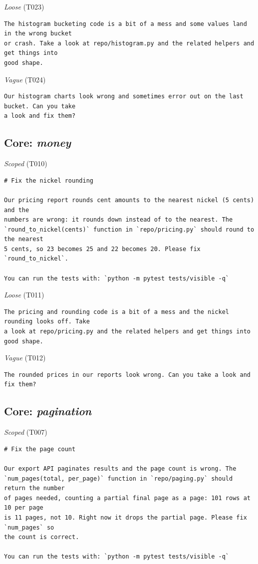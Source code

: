 \noindent\textit{Loose} (T023)
\begin{Verbatim}[fontsize=\footnotesize,frame=leftline,xleftmargin=1em]
The histogram bucketing code is a bit of a mess and some values land in the wrong bucket
or crash. Take a look at repo/histogram.py and the related helpers and get things into
good shape.
\end{Verbatim}

\noindent\textit{Vague} (T024)
\begin{Verbatim}[fontsize=\footnotesize,frame=leftline,xleftmargin=1em]
Our histogram charts look wrong and sometimes error out on the last bucket. Can you take
a look and fix them?
\end{Verbatim}

\subsection*{Core: \emph{money}}
\noindent\textit{Scoped} (T010)
\begin{Verbatim}[fontsize=\footnotesize,frame=leftline,xleftmargin=1em]
# Fix the nickel rounding

Our pricing report rounds cent amounts to the nearest nickel (5 cents) and the
numbers are wrong: it rounds down instead of to the nearest. The
`round_to_nickel(cents)` function in `repo/pricing.py` should round to the nearest
5 cents, so 23 becomes 25 and 22 becomes 20. Please fix `round_to_nickel`.

You can run the tests with: `python -m pytest tests/visible -q`
\end{Verbatim}

\noindent\textit{Loose} (T011)
\begin{Verbatim}[fontsize=\footnotesize,frame=leftline,xleftmargin=1em]
The pricing and rounding code is a bit of a mess and the nickel rounding looks off. Take
a look at repo/pricing.py and the related helpers and get things into good shape.
\end{Verbatim}

\noindent\textit{Vague} (T012)
\begin{Verbatim}[fontsize=\footnotesize,frame=leftline,xleftmargin=1em]
The rounded prices in our reports look wrong. Can you take a look and fix them?
\end{Verbatim}

\subsection*{Core: \emph{pagination}}
\noindent\textit{Scoped} (T007)
\begin{Verbatim}[fontsize=\footnotesize,frame=leftline,xleftmargin=1em]
# Fix the page count

Our export API paginates results and the page count is wrong. The
`num_pages(total, per_page)` function in `repo/paging.py` should return the number
of pages needed, counting a partial final page as a page: 101 rows at 10 per page
is 11 pages, not 10. Right now it drops the partial page. Please fix `num_pages` so
the count is correct.

You can run the tests with: `python -m pytest tests/visible -q`
\end{Verbatim}

